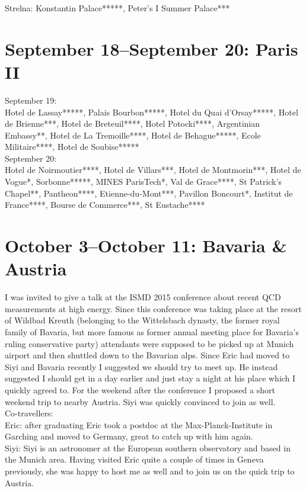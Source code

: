 Strelna: Konstantin Palace*****, Peter's I Summer Palace***\\

\section{September 18--September 20: Paris II}
\label{2015ParisII}

September 19:\\
Hotel de Lassay*****, Palais Bourbon*****, Hotel du Quai d'Orsay*****, Hotel de Brienne***, Hotel de Breteuil****, Hotel Potocki****, Argentinian Embassy**, Hotel de La Tremoille****, Hotel de Behague*****, Ecole Militaire****, Hotel de Soubise*****\\

September 20:\\
Hotel de Noirmoutier****, Hotel de Villars***, Hotel de Montmorin***, Hotel de Vogue*, Sorbonne*****, MINES ParisTech*, Val de Grace****, St Patrick's Chapel**, Pantheon****, Etienne-du-Mont***, Pavillon Boncourt*, Institut de France****, Bourse de Commerce***, St Eustache****

\section{October 3--October 11: Bavaria \& Austria}
\label{Bavaria2015}

I was invited to give a talk at the ISMD 2015 conference about recent QCD measurements at high energy. Since this conference was taking place at the resort of Wildbad Kreuth (belonging to the Wittelsbach dynasty, the former royal family of Bavaria, but more famous as former annual meeting place for Bavaria's ruling conservative party) attendants were supposed to be picked up at Munich airport and then shuttled down to the Bavarian alps. Since Eric had moved to Siyi and Bavaria recently I suggested we should try to meet up. He instead suggested I should get in a day earlier and just stay a night at his place which I quickly agreed to. For the weekend after the conference I proposed a short weekend trip to nearby Austria. Siyi was quickly convinced to join as well.\\

Co-travellers:\\
Eric: after graduating Eric took a postdoc at the Max-Planck-Institute in Garching and moved to Germany, great to catch up with him again.\\

Siyi: Siyi is an astronomer at the European southern observatory and based in the Munich area. Having visited Eric quite a couple of times in Geneva previously, she was happy to host me as well and to join us on the quick trip to Austria.\\

